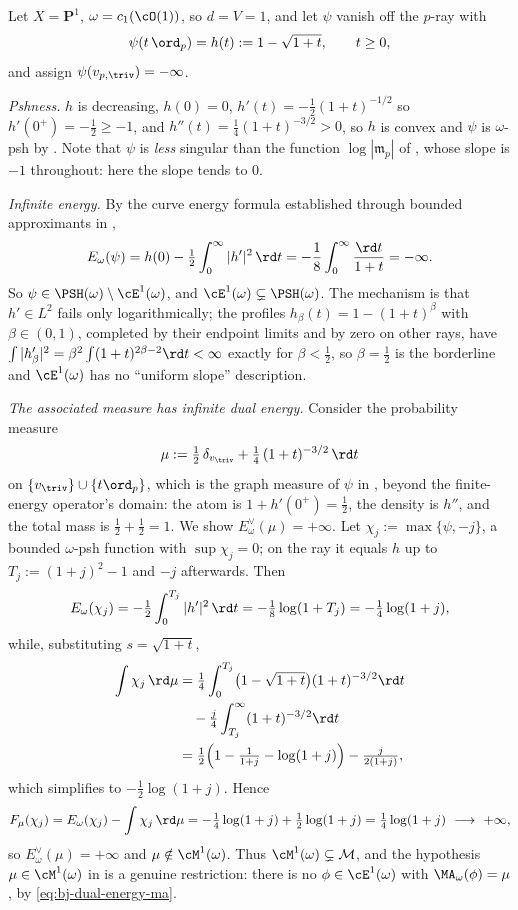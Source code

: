 \begin{example}
\label{ex:ch47-infinite-energy}
Let $X=\mathbf P^1$, $\omega=c_1(\cO(1))$, so $d=V=1$, and let
$\psi$ vanish off the $p$-ray with
\[
 \psi(t\,\ord_p)=h(t):=1-\sqrt{1+t},\qquad t\ge0,
\]
and assign $\psi(v_{p,\triv})=-\infty$.

\emph{Pshness.}  $h$ is decreasing, $h(0)=0$,
$h'(t)=-\tfrac12(1+t)^{-1/2}$ so $h'(0^+)=-\tfrac12\ge-1$, and
$h''(t)=\tfrac14(1+t)^{-3/2}>0$, so $h$ is convex and $\psi$ is
$\omega$-psh by .  Note that $\psi$ is
\emph{less} singular than the function $\log|\mathfrak m_p|$ of
, whose slope is $-1$ throughout: here the slope
tends to $0$.

\emph{Infinite energy.}  By the curve energy formula established through bounded approximants in
,
\[
 E_\omega(\psi)=h(0)-\tfrac12\int_0^\infty|h'|^2\,\rd t
 =-\frac18\int_0^\infty\frac{\rd t}{1+t}=-\infty .
\]
So $\psi\in\PSH(\omega)\setminus\cE^1(\omega)$, and
$\cE^1(\omega)\subsetneq\PSH(\omega)$.  The mechanism is that
$h'\in L^2$ fails only logarithmically; the profiles
$h_\beta(t)=1-(1+t)^{\beta}$ with $\beta\in(0,1)$, completed by their
endpoint limits and by zero on other rays, have
$\int|h_\beta'|^2=\beta^2\int(1+t)^{2\beta-2}\rd t<\infty$ exactly for
$\beta<\tfrac12$, so $\beta=\tfrac12$ is the borderline and
$\cE^1(\omega)$ has no ``uniform slope'' description.

\emph{The associated measure has infinite dual energy.}  Consider the
probability measure
\[
 \mu:=\tfrac12\,\delta_{v_{\triv}}
 +\tfrac14\,(1+t)^{-3/2}\,\rd t
\]
on $\{v_{\triv}\}\cup\{t\ord_p\}$, which is the graph measure of $\psi$ in
\cite[Example~7.20]{BJ22}, beyond the finite-energy operator's domain: the atom is
$1+h'(0^+)=\tfrac12$, the density is $h''$, and the total mass is
$\tfrac12+\tfrac12=1$.  We show $E^\vee_\omega(\mu)=+\infty$.  Let
$\chi_j:=\max\{\psi,-j\}$, a bounded $\omega$-psh function with
$\sup\chi_j=0$; on the ray it equals $h$ up to
$T_j:=(1+j)^2-1$ and $-j$ afterwards.  Then
\[
 E_\omega(\chi_j)=-\tfrac12\int_0^{T_j}|h'|^2\,\rd t
 =-\tfrac18\log(1+T_j)=-\tfrac14\log(1+j),
\]
while, substituting $s=\sqrt{1+t}$,
\[
 \begin{aligned}
 \int\chi_j\,\rd\mu
 &=\tfrac14\int_0^{T_j}\bigl(1-\sqrt{1+t}\bigr)(1+t)^{-3/2}\rd t\\
 &\quad{}-\tfrac{j}{4}\int_{T_j}^\infty(1+t)^{-3/2}\rd t\\
 &=\tfrac12\Bigl(1-\tfrac1{1+j}-\log(1+j)\Bigr)
   -\tfrac{j}{2(1+j)},
 \end{aligned}
\]
which simplifies to $-\tfrac12\log(1+j)$.  Hence
\[
 F_\mu(\chi_j)=E_\omega(\chi_j)-\int\chi_j\,\rd\mu
 =-\tfrac14\log(1+j)+\tfrac12\log(1+j)
 =\tfrac14\log(1+j)\ \longrightarrow\ +\infty ,
\]
so $E^\vee_\omega(\mu)=+\infty$ and $\mu\notin\cM^1(\omega)$.  Thus
$\cM^1(\omega)\subsetneq\mathcal M$, and the hypothesis
$\mu\in\cM^1(\omega)$ in  is a genuine
restriction: there is no $\phi\in\cE^1(\omega)$ with
$\MA_\omega(\phi)=\mu$, by \eqref{eq:bj-dual-energy-ma}.


\end{example}
